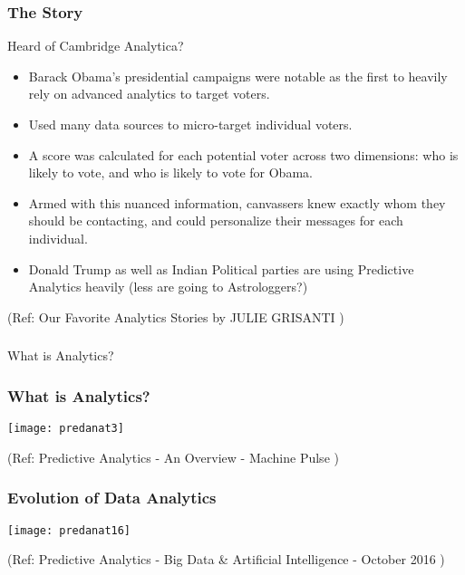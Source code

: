 \begin{frame}\frametitle{The Story}
Heard of Cambridge Analytica?
\begin{itemize}
\item Barack Obama’s presidential campaigns were notable as the first to heavily rely on advanced analytics to target voters.
\item Used many data sources to micro-target individual voters. 
\item A score was calculated for each potential voter across two dimensions: who is likely to vote, and who is likely to vote for Obama. 
\item Armed with this nuanced information, canvassers knew exactly whom they should be contacting, and could personalize their messages for each individual. 
\item Donald Trump as well as Indian Political parties are using Predictive Analytics heavily (less are going to Astrologgers?)
\end{itemize}

{\tiny (Ref: Our Favorite Analytics Stories by JULIE GRISANTI )}

\end{frame}

\begin{frame}[fragile]\frametitle{}
\begin{center}
{\Large What is Analytics?}
\end{center}
\end{frame}

\begin{frame}\frametitle{What is Analytics?}

\begin{center}
\texttt{[image: predanat3]}
\end{center}

{\tiny (Ref: Predictive Analytics - An Overview - Machine Pulse )}

\end{frame}

\begin{frame}\frametitle{Evolution of Data Analytics}

\begin{center}
\texttt{[image: predanat16]}
\end{center}

{\tiny (Ref: Predictive Analytics - Big	Data	\&	Artificial	Intelligence - October 2016 )}

\end{frame}

